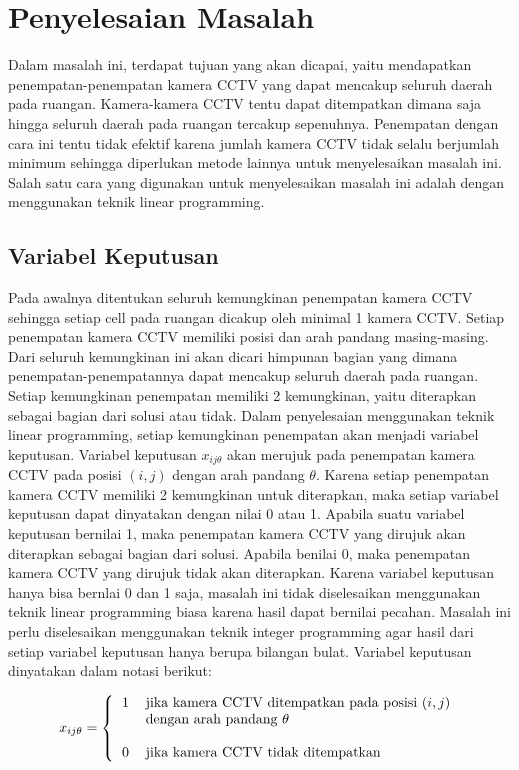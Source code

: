 \section{Penyelesaian Masalah}
Dalam masalah ini, terdapat tujuan yang akan dicapai, yaitu mendapatkan penempatan-penempatan kamera CCTV yang dapat mencakup seluruh daerah pada ruangan. Kamera-kamera CCTV tentu dapat ditempatkan dimana saja hingga seluruh daerah pada ruangan tercakup sepenuhnya. Penempatan dengan cara ini tentu tidak efektif karena jumlah kamera CCTV tidak selalu berjumlah minimum sehingga diperlukan metode lainnya untuk menyelesaikan masalah ini. Salah satu cara yang digunakan untuk menyelesaikan masalah ini adalah dengan menggunakan teknik linear programming.

\subsection{Variabel Keputusan}
Pada awalnya ditentukan seluruh kemungkinan penempatan kamera CCTV sehingga setiap cell pada ruangan dicakup oleh minimal 1 kamera CCTV. Setiap penempatan kamera CCTV memiliki posisi dan arah pandang masing-masing. Dari seluruh kemungkinan ini akan dicari himpunan bagian yang dimana penempatan-penempatannya dapat mencakup seluruh daerah pada ruangan. Setiap kemungkinan penempatan memiliki 2 kemungkinan, yaitu diterapkan sebagai bagian dari solusi atau tidak. Dalam penyelesaian menggunakan teknik linear programming, setiap kemungkinan penempatan akan menjadi variabel keputusan. Variabel keputusan \(x_{ij\theta}\) akan merujuk pada penempatan kamera CCTV pada posisi \((i,j)\) dengan arah pandang \(\theta\). Karena setiap penempatan kamera CCTV memiliki 2 kemungkinan untuk diterapkan, maka setiap variabel keputusan dapat dinyatakan dengan nilai 0 atau 1. Apabila suatu variabel keputusan bernilai 1, maka penempatan kamera CCTV yang dirujuk akan diterapkan sebagai bagian dari solusi. Apabila benilai 0, maka penempatan kamera CCTV yang dirujuk tidak akan diterapkan. Karena variabel keputusan hanya bisa bernlai 0 dan 1 saja, masalah ini tidak diselesaikan menggunakan teknik linear programming biasa karena hasil dapat bernilai pecahan. Masalah ini perlu diselesaikan menggunakan teknik integer programming agar hasil dari setiap variabel keputusan hanya berupa bilangan bulat. Variabel keputusan dinyatakan dalam notasi berikut:

\begin{equation*}
	x_{ij\theta} =
	\left \{
  		\begin{tabular}{cl}
  			1 & jika kamera CCTV ditempatkan pada posisi $(i,j)$\\
  			  & dengan arah pandang $\theta$\\
  			  &  \\
  			0 & jika kamera CCTV tidak ditempatkan
  		\end{tabular}
  	\right.
\end{equation*}

